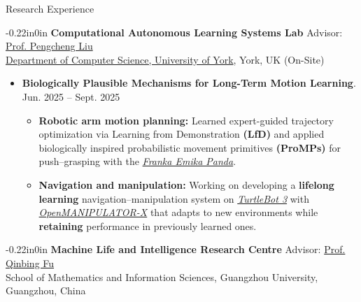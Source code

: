 \documentclass{resume} %
\begin{document}
\begin{rSection}{Research Experience}
\begin{adjustwidth}{-0.22in}{0in}
	\textbf{Computational Autonomous Learning Systems Lab}
	\quad Advisor:  \href{https://scholar.google.com/citations?user=VxmFgc0AAAAJ&hl=zh-CN}
	{Prof. Pengcheng Liu} \\
	\href{https://www.york.ac.uk/computer-science/research/}
	{Department of Computer Science, University of York}, York, UK (On-Site)
\end{adjustwidth}
\begin{itemize}[left = -0.22in]
	
	\item \textbf{Biologically Plausible Mechanisms for Long-Term Motion Learning}. 
	\hfill Jun. 2025 -- Sept. 2025
	\begin{itemize}[label=\textopenbullet] %
		\vspace{-0.2em}
		\item \textbf{Robotic arm motion planning:} Learned expert-guided trajectory optimization via Learning from Demonstration \textbf{(LfD)} and applied biologically inspired probabilistic movement primitives \textbf{(ProMPs)} for push–grasping with the \href{https://franka.de/}{\textit{Franka Emika Panda}}.
		
		\vspace{-0.5em}
		\item \textbf{Navigation and manipulation:} Working on developing a \textbf{lifelong learning} navigation–manipulation system on \href{https://www.turtlebot.com/turtlebot3/}{\textit{TurtleBot 3}} with \href{https://emanual.robotis.com/docs/en/platform/openmanipulator_x/overview/}{\textit{OpenMANIPULATOR-X}} that adapts to new environments while \textbf{retaining} performance in previously learned ones.
	\end{itemize}
\end{itemize}

\begin{adjustwidth}{-0.22in}{0in}
	\textbf{Machine Life and Intelligence Research Centre}
	\quad Advisor:  \href{https://scholar.google.com/citations?user=YIte1M8AAAAJ\&hl=zh-CN}{Prof. Qinbing Fu} \\
	School of Mathematics and Information Sciences, Guangzhou University, Guangzhou, China
\end{adjustwidth}


\end{rSection}
\end{document}
